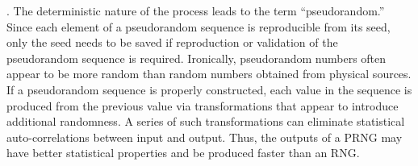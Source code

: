. The deterministic nature of the process leads to the term “pseudorandom.” Since each element of a pseudorandom sequence is reproducible from its seed, only the seed needs to be saved if reproduction or validation of the pseudorandom sequence is required. Ironically, pseudorandom numbers often appear to be more random than random numbers obtained from physical sources. If a pseudorandom sequence is properly constructed, each value in the sequence is produced from the previous value via transformations that appear to introduce additional randomness. A series of such transformations can eliminate statistical auto-correlations between input and output. Thus, the outputs of a PRNG may have better statistical properties and be produced faster than an RNG. 
